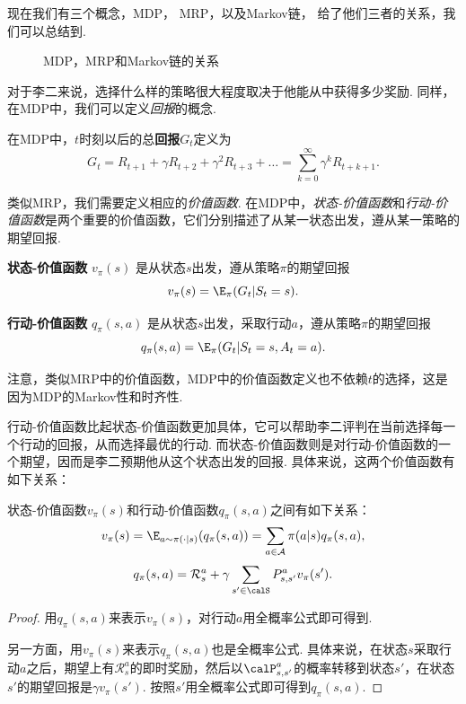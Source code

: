现在我们有三个概念，MDP， MRP，以及Markov链， 给了他们三者的关系，我们可以总结到. 

\begin{figure}[ht]
\centering
{}
\caption{MDP，MRP和Markov链的关系}\label{fig:MDP-MRP-MarkovChain}
\end{figure}

对于李二来说，选择什么样的策略很大程度取决于他能从中获得多少奖励. 同样，在MDP中，我们可以定义\emph{回报}的概念. 

\begin{definition}[回报]
在MDP中，$t$时刻以后的总\textbf{回报}$G_t$定义为
    \[G_t = R_{t+1} + \gamma R_{t+2} + \gamma^2 R_{t+3} + \dots = \sum_{k=0}^\infty \gamma^k R_{t+k+1}.\]
\end{definition}

类似MRP，我们需要定义相应的\emph{价值函数}. 在MDP中，\emph{状态-价值函数}和\emph{行动-价值函数}是两个重要的价值函数，它们分别描述了从某一状态出发，遵从某一策略的期望回报. 

\begin{definition}[价值函数]
\textbf{状态-价值函数} $v_\pi(s)$ 是从状态$s$出发，遵从策略$\pi$的期望回报
    \[v_\pi(s) = \E_\pi(G_t|S_t=s).\]

\textbf{行动-价值函数} $q_\pi(s,a)$ 是从状态$s$出发，采取行动$a$，遵从策略$\pi$的期望回报
    \[q_\pi(s,a) = \E_\pi(G_t|S_t=s,A_t=a).\]
\end{definition}
注意，类似MRP中的价值函数，MDP中的价值函数定义也不依赖$t$的选择，这是因为MDP的Markov性和时齐性. 

行动-价值函数比起状态-价值函数更加具体，它可以帮助李二评判在当前选择每一个行动的回报，从而选择最优的行动. 而状态-价值函数则是对行动-价值函数的一个期望，因而是李二预期他从这个状态出发的回报. 具体来说，这两个价值函数有如下关系：

\begin{proposition}\label{prop:state-action-value}
状态-价值函数$v_\pi(s)$和行动-价值函数$q_\pi(s,a)$之间有如下关系：
    \[v_\pi(s) = \E_{a\sim\pi(\cdot|s)}(q_\pi(s,a))=\sum_{a\in\mathcal A}\pi(a|s)q_\pi(s,a),\]
    \[q_\pi(s,a) =\mathcal R_s^a + \gamma \sum_{s'\in \calS}P_{s,s'}^a v_\pi(s').\]
\end{proposition}
\begin{proof}
    用$q_\pi(s,a)$来表示$v_\pi(s)$，对行动$a$用全概率公式即可得到. 

    另一方面，用$v_\pi(s)$来表示$q_\pi(s,a)$也是全概率公式. 具体来说，在状态$s$采取行动$a$之后，期望上有$\mathcal R_s^a$的即时奖励，然后以$\calP_{s,s'}^a$的概率转移到状态$s'$，在状态$s'$的期望回报是$\gamma v_\pi(s')$. 按照$s'$用全概率公式即可得到$q_\pi(s,a)$.
\end{proof}

